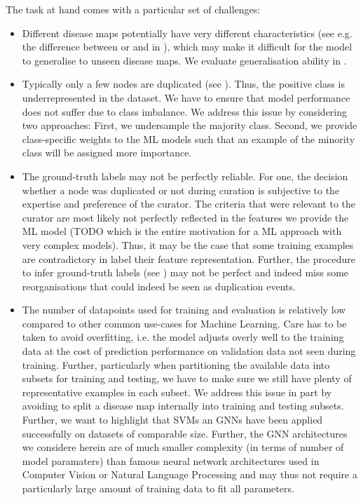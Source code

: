\documentclass[
	fontsize=10pt, %
	twoside=false, %
	secnumdepth=1, %
]{kaobook}
\begin{document}
The task at hand comes with a particular set of challenges:
\begin{itemize}
\item Different disease maps potentially have very different characteristics
  (see e.g. the difference between \ADMap or \PDMap and \ReconMap in
  ), which may make it difficult for the model to
  generalise to unseen disease maps. We evaluate generalisation ability in
  .
\item Typically only a few nodes are duplicated (see ).
  Thus, the positive class is underrepresented in the dataset. We have to ensure that
  model performance does not suffer due to class imbalance. We address this
  issue by considering two approaches: First, we undersample the majority class.
  Second, we provide class-specific weights to the ML models such that an
  example of the minority class will be assigned more importance.
\item The ground-truth labels may not be perfectly reliable.
  For one, the decision whether a node was duplicated or not during curation is
  subjective to the expertise and preference of the curator. The criteria that
  were relevant to the curator are most likely not perfectly reflected in the
  features we provide the ML model (TODO which is the entire motivation for a ML
  approach with very complex models). Thus, it may be the case that some
  training examples are contradictory in label \wrt their feature
  representation.
  Further, the procedure to infer ground-truth labels (see
  ) may not be perfect and indeed miss some
  reorganisations that could indeed be seen as duplication events.
\item The number of datapoints used for training and evaluation is relatively
  low compared to other common use-cases for Machine Learning. Care has to be
  taken to avoid overfitting, i.e. the model adjusts overly well to the training
  data at the cost of prediction performance on validation data not seen during
  training. Further, particularly when partitioning the available data into
  subsets for training and testing, we have to make sure we still have plenty of
  representative examples in each subset. We address this issue in part by avoiding to
  split a disease map internally into training and testing subsets. Further, we
  want to highlight that SVMs an GNNs have been applied successfully on datasets
  of comparable size.
  Further, the GNN architectures we considere herein are of
  much smaller complexity (in terms of number of model paramaters) than famous
  neural network architectures used in Computer Vision or Natural Language
  Processing
  and may thus not require a particularly large amount of training
  data to fit all parameters.
\end{itemize}
\end{document}
